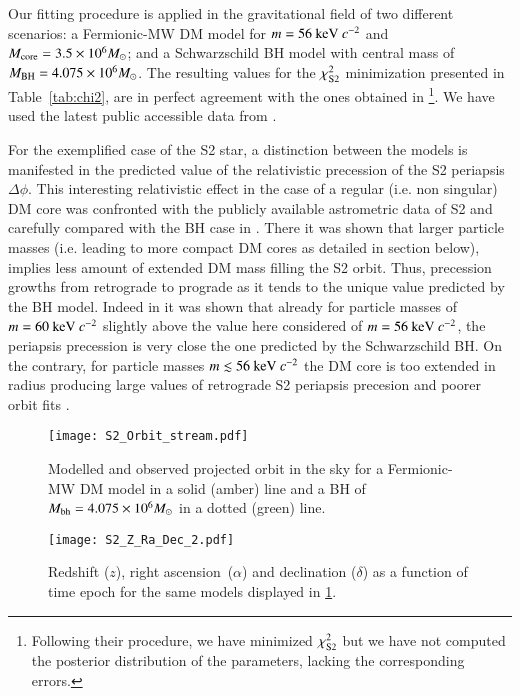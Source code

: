 \documentclass[twocolumn]{aa}
\begin{document}
Our fitting procedure is applied in the gravitational field of two different scenarios: a Fermionic-MW DM model for $m=56~{\rm keV}~c^{-2}$ and $M_{\rm{core}}=3.5\times 10^6 M_\odot$; and a Schwarzschild BH model with central mass of $M_{\rm BH}=4.075\times 10^6 M_\odot$.
The resulting values for the $\chi^2_{\rm{S2}}$ minimization presented in Table~\ref{tab:chi2}, are in perfect agreement with the ones obtained in \cite{2020A&A...641A..34B}\footnote{Following their procedure, we have minimized $\chi^2_{\rm{S2}}$ but we have not computed the posterior distribution of the parameters, lacking the corresponding errors.}.
We have used the latest public accessible data from \cite{2019Sci...365..664D}.

For the exemplified case of the S2 star, a distinction between the models is manifested in the predicted value of the relativistic precession of the S2 periapsis $\Delta \phi$. This interesting relativistic effect in the case of a regular (i.e. non singular) DM core was confronted with the publicly available astrometric data of S2 and carefully compared with the BH case in \cite{2022MNRAS.511L..35A}. There it was shown that larger particle masses (i.e. leading to more compact DM cores as detailed in section below), implies less amount of extended DM mass filling the S2 orbit. Thus, precession growths from retrograde to prograde as it tends to the unique value predicted by the BH model. Indeed in \cite{2022MNRAS.511L..35A} it was shown that already for particle masses of $m = 60~{\rm keV}~c^{-2}$ slightly above the value here considered of $m=56~{\rm keV}~c^{-2}$, the periapsis precession is very close the one predicted by the Schwarzschild BH. On the contrary, for particle masses $m\lesssim 56~{\rm keV}~c^{-2}$ the DM core is too extended in radius producing large values of retrograde S2 periapsis precesion and poorer orbit fits \citep{2020A&A...641A..34B,2022MNRAS.511L..35A}.
%
\begin{figure}
   \texttt{[image: S2\_Orbit\_stream.pdf]}
\caption{Modelled and observed projected orbit in the sky for a Fermionic-MW DM model in a solid (amber) line and a BH of $M_{\rm bh}=4.075\times 10^6 M_\odot$ in a dotted (green) line.}
   \label{fig:S2_fit}
\end{figure}

\begin{figure}
   \texttt{[image: S2\_Z\_Ra\_Dec\_2.pdf]}
   \caption{Redshift ($z$), right ascension~($\alpha$) and declination ($\delta$) as a function of time epoch for the same models
   displayed in \cref{fig:S2_fit}.}
   \label{fig:S2_fit_b}
\end{figure}
\end{document}
